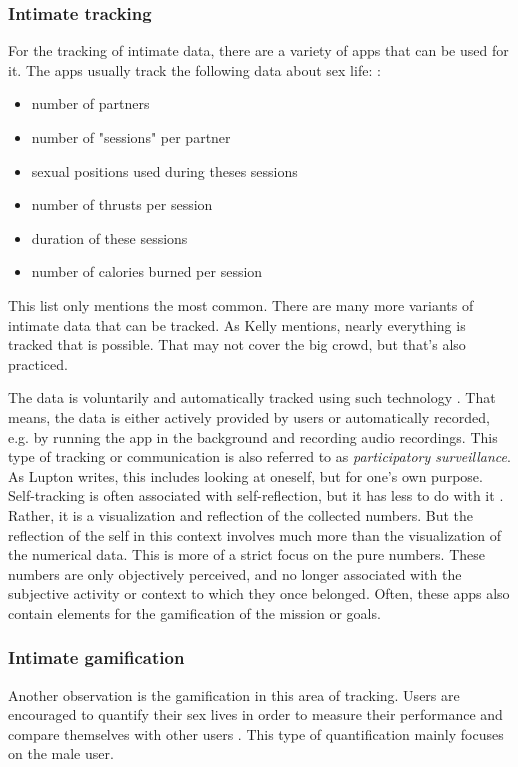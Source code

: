 \subsubsection{Intimate tracking}
For the tracking of intimate data, there are a variety of apps that can be used for it.
The apps usually track the following data about sex life: \cite{doi:10.1080/15265161.2017.1409823}: 
\begin{itemize}
	\item number of partners
	\item number of "sessions" per partner
	\item sexual positions used during theses sessions
	\item number of thrusts per session
	\item duration of these sessions
	\item number of calories burned per session 
\end{itemize}
This list only mentions the most common. There are many more variants of intimate data that can be tracked. As Kelly \cite{kelly2017inevitable} mentions, nearly everything is tracked that is possible. That may not cover the big crowd, but that's also practiced.

The data is voluntarily and automatically tracked using such technology \cite{doi:10.1080/15265161.2017.1409823}. That means, the data is either actively provided by users or automatically recorded, e.g. by running the app in the background and recording audio recordings.
This type of tracking or communication is also referred to as \textit{participatory surveillance}. As Lupton \cite{doi:10.1080/13691058.2014.920528} writes, this includes looking at oneself, but for one's own purpose. Self-tracking is often associated with self-reflection, but it has less to do with it \cite{lupton2016quantified}. Rather, it is a visualization and reflection of the collected numbers. But the reflection of the self in this context involves much more than the visualization of the numerical data. This is more of a strict focus on the pure numbers. These numbers are only objectively perceived, and no longer associated with the subjective activity or context to which they once belonged.
Often, these apps also contain elements for the gamification of the mission or goals.

\subsubsection{Intimate gamification}
Another observation is the gamification in this area of tracking. Users are encouraged to quantify their sex lives in order to measure their performance and compare themselves with other users \cite{doi:10.1080/13691058.2014.920528}. This type of quantification mainly focuses on the male user.

